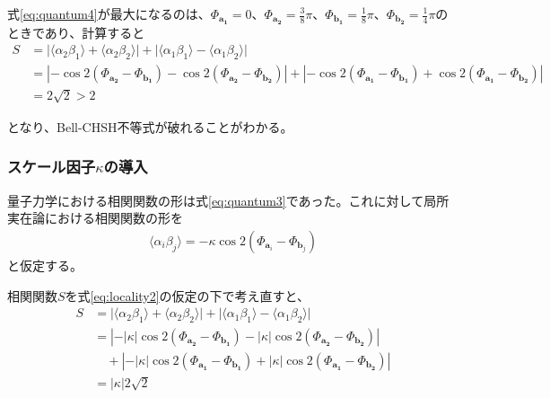 \documentclass[../../main.tex]{subfiles}
\numberwithin{equation}{section}
\numberwithin{table}{section}
\numberwithin{figure}{section}
\begin{document}
式\eqref{eq:quantum4}が最大になるのは、$\Phi_{\mathbf{a_1}}=0$、$\Phi_{\mathbf{a_2}}=\frac{3}{8}\pi$、$\Phi_{\mathbf{b_1}}=\frac{1}{8}\pi$、$\Phi_{\mathbf{b_2}}=\frac{1}{4}\pi$のときであり、計算すると
\begin{align}
  S &= \lvert \langle \alpha_2\beta_1 \rangle + \langle \alpha_2\beta_2 \rangle \rvert + \lvert \langle \alpha_1\beta_1 \rangle - \langle \alpha_1\beta_2 \rangle \rvert \nonumber\\
  &= \left| - \cos2 \left(\Phi_{\mathbf{a_2}} - \Phi_{\mathbf{b_1}} \right) - \cos2 \left( \Phi_{\mathbf{a_2}} - \Phi_{\mathbf{b_2}} \right) \right| +\left| - \cos2 \left(\Phi_{\mathbf{a_1}} - \Phi_{\mathbf{b_1}} \right) + \cos2 \left(\Phi_{\mathbf{a_1}} - \Phi_{\mathbf{b_2}} \right) \right|\nonumber \\
  &=2\sqrt{2}>2
  \label{eq:quantum5}
\end{align}

となり、Bell-CHSH不等式が破れることがわかる。

\subsubsection{スケール因子$\kappa$の導入}
量子力学における相関関数の形は式\eqref{eq:quantum3}であった。これに対して局所実在論における相関関数の形を
\begin{align}
  \langle \alpha_i\beta_j \rangle= -\kappa \cos2 \left(\Phi_{\mathbf{a}_{\mathit{i}}}-\Phi_{\mathbf{b}_{\mathit{j}}} \right)\label{eq:locality2}
\end{align}
と仮定する。

相関関数$S$を式\eqref{eq:locality2}の仮定の下で考え直すと、
\begin{align}
  S &= \lvert \langle \alpha_2\beta_1 \rangle + \langle \alpha_2\beta_2 \rangle \rvert + \lvert \langle \alpha_1\beta_1 \rangle - \langle \alpha_1\beta_2 \rangle \rvert \nonumber\\
  &= \left| - \lvert \kappa \rvert \cos2 \left(\Phi_{\mathbf{a_2}} - \Phi_{\mathbf{b_1}} \right) - \lvert \kappa \rvert \cos2 \left(\Phi_{\mathbf{a_2}} - \Phi_{\mathbf{b_2}}\right) \right| \\
  & \quad +\left| - \lvert \kappa \rvert \cos2 \left(\Phi_{\mathbf{a_1}} - \Phi_{\mathbf{b_1}} \right) + \lvert \kappa \rvert \cos2 \left(\Phi_{\mathbf{a_1}} - \Phi_{\mathbf{b_2}} \right) \right|\nonumber \\
  &=\lvert \kappa \rvert 2\sqrt{2}
  \label{eq:quantum6}
\end{align}
\end{document}
